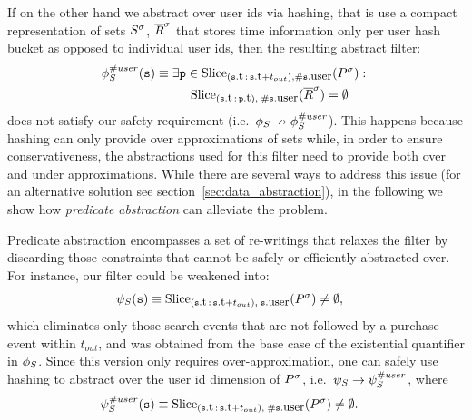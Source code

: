 If on the other hand we abstract over user ids via hashing, that is
use a compact representation of sets ${S}^{\sigma}$, ${\overline{R}}^{\sigma}$ that stores time
information only per user hash bucket as opposed to individual user ids, then
the resulting abstract filter:
\begin{align*}
&
\PrecedesP^{\hashid{user}}(\symv{s}) \equiv 
\exists \symv{p} \in 
\slice{\syms{P}}
{(\facc{\symv{s}}{t}\,:\,\facc{\symv{s}}{t} + t_{out}),
	\hashid{\facc{\symv{s}}{user}}} :\ 
\\
&\qqquad\qquad\quad
\slice{\syms{\oR}}
{(\facc{\symv{s}}{t}\,:\,\facc{\symv{p}}{t}),\; 
	\hashid{\facc{\symv{s}}{user}}}
= \emptyset 
\end{align*}
does not satisfy our safety requirement 
(i.e.\ $\phi_{S} \nrightarrow \phi_{S}^{\# user}$).
This happens because hashing can only provide over approximations of sets while,
in order to ensure conservativeness, the abstractions used for this filter need
to provide both over and under approximations.
While there are several ways to address this issue (for an alternative solution 
see section~\ref{sec:data_abstraction}), 
in the following we show how {\em predicate abstraction} can alleviate the 
problem.


Predicate abstraction encompasses a set of re-writings 
that relaxes the filter by discarding those constraints that cannot be safely
or efficiently abstracted over.
For instance, our filter could be weakened into:
\begin{align*}
&
\PrecedesPPP(\symv{s}) \equiv 
\slice{\syms{P}}
{(\facc{\symv{s}}{t}\,:\,\facc{\symv{s}}{t} + t_{out}),\; 
	\facc{\symv{s}}{user}}
 \neq \emptyset,
\end{align*} 
which eliminates only those search events that are not followed by a purchase
event within $t_{out}$, and was obtained from the base case of
the existential quantifier in $\phi_{S}$.
Since this version only requires over-approximation, one can safely use hashing
to abstract over the user id dimension of ${P}^{\sigma}$, i.e.\ 
$\psi_S \rightarrow \psi_S^{\# user}$, where
\begin{align*}
&
\PrecedesPPP^{\hashid{user}}(\symv{s}) \equiv 
\slice{\syms{P}}
{(\facc{\symv{s}}{t}\,:\,\facc{\symv{s}}{t} + t_{out}),\; 
	\hashid{\facc{\symv{s}}{user}}}
 \neq \emptyset .
\end{align*}

